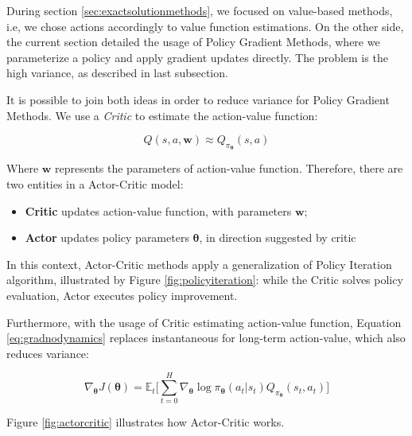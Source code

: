 During section \ref{sec:exactsolutionmethods}, we focused on value-based methods, i.e, we chose actions accordingly to value function estimations. On the other side, the current section detailed the usage of Policy Gradient Methods, where we parameterize a policy and apply gradient updates directly. The problem is the high variance, as described in last subsection.

It is possible to join both ideas in order to reduce variance for Policy Gradient Methods. We use a \textit{Critic} to estimate the action-value function:

\begin{equation}
Q(s, a, \boldsymbol{w}) \approx Q_{\pi_{\boldsymbol{\theta}}}(s,a) 
\end{equation}

Where $\boldsymbol{w}$ represents the parameters of action-value function. Therefore, there are two entities in a Actor-Critic model:

\begin{itemize}
	\item \textbf{Critic} updates action-value function, with parameters $\boldsymbol{w}$;
	\item \textbf{Actor} updates policy parameters $\boldsymbol{\theta}$, in direction suggested by critic
\end{itemize}

In this context, Actor-Critic methods apply a generalization of Policy Iteration algorithm, illustrated by Figure \ref{fig:policyiteration}: while the Critic solves policy evaluation, Actor executes policy improvement.

Furthermore, with the usage of Critic estimating action-value function, Equation \ref{eq:gradnodynamics} replaces instantaneous for long-term action-value, which also reduces variance:

\begin{equation}
\nabla_{\boldsymbol{\theta}} J(\boldsymbol{\theta}) = \mathbb{E}_{t} \Bigg[ \sum_{t=0}^{H} \nabla_{\boldsymbol{\theta}} \log \pi_{\boldsymbol{\theta}} (a_{t}|s_{t}) Q_{\pi_{\boldsymbol{\theta}}}(s_{t},a_{t}) \Bigg]
\end{equation}


Figure \ref{fig:actorcritic} illustrates how Actor-Critic works.


